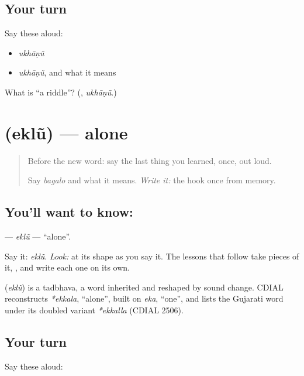 \subsection*{Your turn}
Say these aloud:

\begin{itemize}
\raggedright
  \item \emph{ukhāṇũ}
  \item \emph{ukhāṇũ}, and what it means
\end{itemize}

\begin{tcolorbox}[breakable,colback=teal!4,colframe=teal!35!black,title={Before you move on}]
What is \textquotedblleft{}a riddle\textquotedblright{}? (\textbf{}, \emph{ukhāṇũ}.)
\end{tcolorbox}
\section[\texorpdfstring{\gu{એકલું} (eklũ)}{એકલું (eklũ)}]{ (eklũ) — alone}

\label{lesson:GU-C06-eklun}



\begin{quote}
Before the new word: say the last thing you learned, once, out loud.

Say \emph{bagalo} and what it means. \emph{Write it:} the \textbf{} hook once from memory.
\end{quote}

\subsection*{You'll want to know: }
\textbf{} — \emph{eklũ} — \textquotedblleft{}alone\textquotedblright{}.

Say it: \emph{eklũ}. \emph{Look:} at its shape as you say it. The lessons that follow take pieces of it, \textbf{}, and write each one on its own.

\begin{cousinweb}
\textbf{} (\emph{eklũ}) is a tadbhava, a word inherited and reshaped by sound change. CDIAL reconstructs \emph{*ekkala}, \textquotedblleft{}alone\textquotedblright{}, built on \emph{eka}, \textquotedblleft{}one\textquotedblright{}, and lists the Gujarati word under its doubled variant \emph{*ekkalla} (CDIAL 2506).
\end{cousinweb}

\subsection*{Your turn}
Say these aloud:

